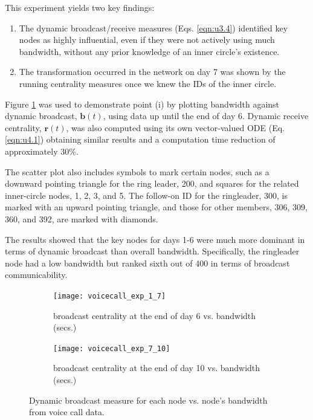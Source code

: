 This experiment yields two key findings:
\begin{enumerate}[label=(\roman*)]
  \item The dynamic broadcast/receive measures (Eqs. \ref{eqn:u3.4}) identified key nodes as highly influential, even if they were not actively using much bandwidth, without any prior knowledge of an inner circle's existence.
  \item The transformation  occurred in the network on day 7 was shown by the running centrality measures once we knew the IDs of the inner circle.
\end{enumerate}


\newpage

Figure \ref{fig:ve1a} was used to demonstrate point (i) by plotting bandwidth against dynamic broadcast, $\mathbf{b}(t)$, using data up until the end of day 6. Dynamic receive centrality, $\mathbf{r}(t)$, was also computed using its own vector-valued ODE (Eq. \ref{eqn:u4.1}) obtaining similar results and a computation time reduction of approximately $30\%$.


The scatter plot also includes symbols to mark certain nodes, such as a downward pointing triangle for the ring leader, 200, and squares for the related inner-circle nodes, 1, 2, 3, and 5. The follow-on ID for the ringleader, 300, is marked with an upward pointing triangle, and those for other members, 306, 309, 360, and 392, are marked with diamonds.

The results showed that the key nodes for days 1-6 were much more dominant in terms of dynamic broadcast than overall bandwidth. Specifically, the ringleader node had a low bandwidth but ranked sixth out of 400 in terms of broadcast communicability.

\begin{figure}[h]
     \centering
     \begin{subfigure}[b]{0.49\textwidth}
         \centering
         \texttt{[image: voicecall\_exp\_1\_7]}
         \caption{broadcast centrality at the end of day 6 vs. bandwidth (secs.)}
         \label{fig:ve1a}
     \end{subfigure}
     \hfill
     \begin{subfigure}[b]{0.49\textwidth}
         \centering
         \texttt{[image: voicecall\_exp\_7\_10]}
         \caption{broadcast centrality at the end of day 10 vs. bandwidth (secs.)}
         \label{fig:ve1b}
     \end{subfigure}
     \caption{Dynamic broadcast measure for each node vs. node's bandwidth from voice call data.}
     \label{fig:ve1}
\end{figure}

